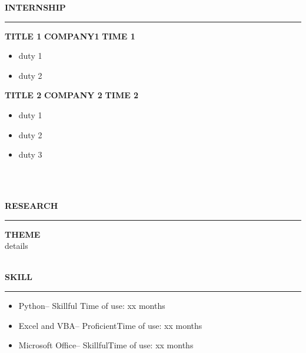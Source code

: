 \documentclass{article}
\theoremstyle{plain}
\begin{document}
\begin{itemize}
{{{{{\begin{flushleft}
\MakeUppercase{\Large\textbf{internship}} %
\end{flushleft}
\rule[4pt]{18cm}{0.5pt} %


\MakeUppercase{\small\textbf{title 1}}  %
\hfill
\MakeUppercase{\small\textbf{company1}}
\hfill
\MakeUppercase{\small\textbf{time 1}}
\begin{itemize}
	\item{\normalsize{duty 1}}
	\item{\normalsize{duty 2}}
\end{itemize}


\MakeUppercase{\small\textbf{title 2}} %
\hfill
\MakeUppercase{\small\textbf{company 2}}
\hfill
\MakeUppercase{\small\textbf{time 2}}

\begin{itemize}
	\item{\normalsize{duty 1}}
	\item{\normalsize{duty 2}}
	\item{\normalsize{duty 3}}
	
\end{itemize}

\\\hspace*{\fill}\\

\begin{flushleft}
\MakeUppercase{\Large\textbf{research}}  %
\end{flushleft}  
\rule[4pt]{18cm}{0.5pt} %

\MakeUppercase{\small\textbf{theme}}
\\{details}
\\\hspace*{\fill}\\

\begin{flushleft}
\MakeUppercase{\Large\textbf{skill}} %
\end{flushleft}
\rule[4pt]{18cm}{0.5pt} %

\begin{itemize}
	\item{\normalsize{Python-- Skillful}\hfill{ Time of use: xx months}}
	\item{\normalsize{Excel and VBA-- Proficient}\hfill{Time of use: xx months}}
	\item{\normalsize{Microsoft Office-- Skillful}\hfill{Time of use: xx months}}	
\end{itemize}

}}}}}
\end{itemize}
\end{document}
